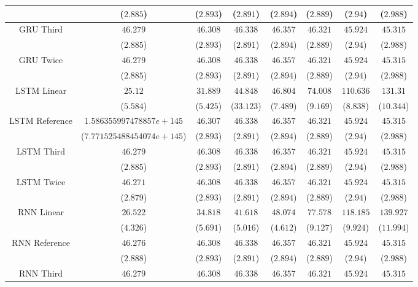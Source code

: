 \begin{table}[!ht]
{\begin{tabular}{|c|c|c|c|c|c|c|c|}
			 & ($2.885$) & ($2.893$) & ($2.891$) & ($2.894$) & ($2.889$) & ($2.94$) & ($2.988$) \\ \hline
			\multirow{2}{*}{GRU Third} & $46.279$ & $46.308$ & $46.338$ & $46.357$ & $46.321$ & $45.924$ & $45.315$ \\
			 & ($2.885$) & ($2.893$) & ($2.891$) & ($2.894$) & ($2.889$) & ($2.94$) & ($2.988$) \\ \hline
			\multirow{2}{*}{GRU Twice} & $46.279$ & $46.308$ & $46.338$ & $46.357$ & $46.321$ & $45.924$ & $45.315$ \\
			 & ($2.885$) & ($2.893$) & ($2.891$) & ($2.894$) & ($2.889$) & ($2.94$) & ($2.988$) \\ \hline
			\multirow{2}{*}{LSTM Linear} & $25.12$ & $31.889$ & $44.848$ & $46.804$ & $74.008$ & $110.636$ & $131.31$ \\
			 & ($5.584$) & ($5.425$) & ($33.123$) & ($7.489$) & ($9.169$) & ($8.838$) & ($10.344$) \\ \hline
			\multirow{2}{*}{LSTM Reference} & $1.586355997478857e+145$ & $46.307$ & $46.338$ & $46.357$ & $46.321$ & $45.924$ & $45.315$ \\
			 & ($7.771525488454074e+145$) & ($2.893$) & ($2.891$) & ($2.894$) & ($2.889$) & ($2.94$) & ($2.988$) \\ \hline
			\multirow{2}{*}{LSTM Third} & $46.279$ & $46.308$ & $46.338$ & $46.357$ & $46.321$ & $45.924$ & $45.315$ \\
			 & ($2.885$) & ($2.893$) & ($2.891$) & ($2.894$) & ($2.889$) & ($2.94$) & ($2.988$) \\ \hline
			\multirow{2}{*}{LSTM Twice} & $46.271$ & $46.308$ & $46.338$ & $46.357$ & $46.321$ & $45.924$ & $45.315$ \\
			 & ($2.879$) & ($2.893$) & ($2.891$) & ($2.894$) & ($2.889$) & ($2.94$) & ($2.988$) \\ \hline
			\multirow{2}{*}{RNN Linear} & $26.522$ & $34.818$ & $41.618$ & $48.074$ & $77.578$ & $118.185$ & $139.927$ \\
			 & ($4.326$) & ($5.691$) & ($5.016$) & ($4.612$) & ($9.127$) & ($9.924$) & ($11.994$) \\ \hline
			\multirow{2}{*}{RNN Reference} & $46.276$ & $46.308$ & $46.338$ & $46.357$ & $46.321$ & $45.924$ & $45.315$ \\
			 & ($2.888$) & ($2.893$) & ($2.891$) & ($2.894$) & ($2.889$) & ($2.94$) & ($2.988$) \\ \hline
			\multirow{2}{*}{RNN Third} & $46.279$ & $46.308$ & $46.338$ & $46.357$ & $46.321$ & $45.924$ & $45.315$ \\

\end{tabular}}
\end{table}
